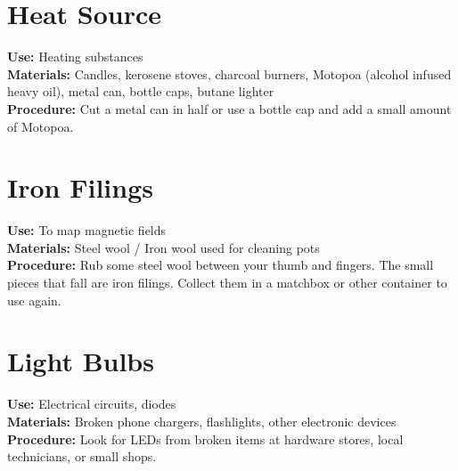 \section{Heat Source}
\label{sec:heatsources}
\vspace{-10pt}
\textbf{Use:} Heating substances\\
\textbf{Materials:} Candles, kerosene stoves, charcoal burners, Motopoa (alcohol infused heavy oil), metal can, bottle caps, butane lighter \\
\textbf{Procedure:} Cut a metal can in half or use a bottle cap and add a small amount of Motopoa.

\section{Iron Filings}
\vspace{-10pt}
\textbf{Use:} To map magnetic fields\\
\textbf{Materials:} Steel wool / Iron wool used for cleaning pots\\
\textbf{Procedure:} Rub some steel wool between your thumb and fingers.  The small pieces that fall are iron filings.  Collect them in a matchbox or other container to use again.

\section{Light Bulbs}
\vspace{-10pt}
\textbf{Use:} Electrical circuits, diodes\\
\textbf{Materials:} Broken phone chargers, flashlights, other electronic devices\\
\textbf{Procedure:} Look for LEDs from broken items at hardware stores, local technicians, or small shops. 

